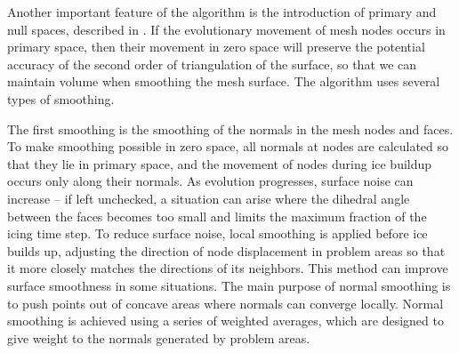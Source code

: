 \documentclass[
11pt,%
tightenlines,%
twoside,%
onecolumn,%
nofloats,%
nobibnotes,%
nofootinbib,%
superscriptaddress,%
noshowpacs,%
centertags]%
{revtex4-2}
\begin{document}
Another important feature of the algorithm is the introduction of primary and null spaces, described in \cite{Jiao_null_space_smooth}.
If the evolutionary movement of mesh nodes occurs in primary space, then their movement in zero space will preserve the potential accuracy of the second order of triangulation of the surface, so that we can maintain volume when smoothing the mesh surface.
The algorithm uses several types of smoothing.

The first smoothing is the smoothing of the normals in the mesh nodes and faces.
To make smoothing possible in zero space, all normals at nodes are calculated so that they lie in primary space, and the movement of nodes during ice buildup occurs only along their normals.
As evolution progresses, surface noise can increase -- if left unchecked, a situation can arise where the dihedral angle between the faces becomes too small and limits the maximum fraction of the icing time step.
To reduce surface noise, local smoothing is applied before ice builds up, adjusting the direction of node displacement in problem areas so that it more closely matches the directions of its neighbors.
This method can improve surface smoothness in some situations.
The main purpose of normal smoothing is to push points out of concave areas where normals can converge locally.
Normal smoothing is achieved using a series of weighted averages, which are designed to give weight to the normals generated by problem areas.
\end{document}
